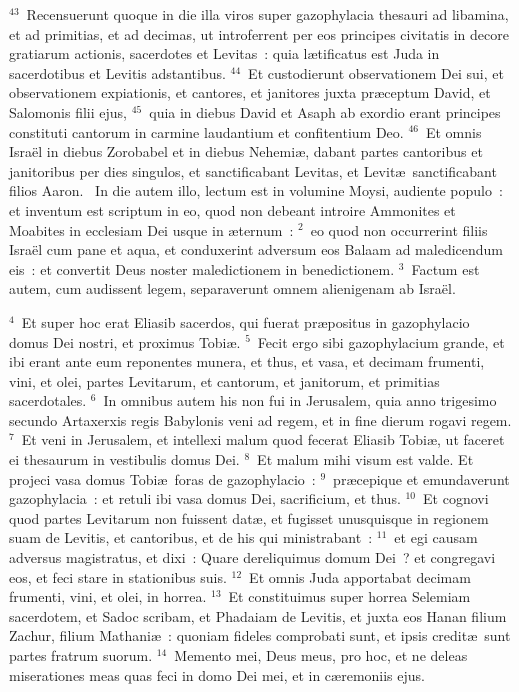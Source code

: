 ${}^{43}$~Recensuerunt quoque in die illa viros super gazophylacia thesauri ad libamina, et ad primitias, et ad decimas, ut introferrent per eos principes civitatis in decore gratiarum actionis, sacerdotes et Levitas~: quia l\ae tificatus est Juda in sacerdotibus et Levitis adstantibus.
${}^{44}$~Et custodierunt observationem Dei sui, et observationem expiationis, et cantores, et janitores juxta pr\ae ceptum David, et Salomonis filii ejus,
${}^{45}$~quia in diebus David et Asaph ab exordio erant principes constituti cantorum in carmine laudantium et confitentium Deo.
${}^{46}$~Et omnis Isra\"el in diebus Zorobabel et in diebus Nehemi\ae , dabant partes cantoribus et janitoribus per dies singulos, et sanctificabant Levitas, et Levit\ae\ sanctificabant filios Aaron.
~In die autem illo, lectum est in volumine Moysi, audiente populo~: et inventum est scriptum in eo, quod non debeant introire Ammonites et Moabites in ecclesiam Dei usque in \ae ternum~:
${}^{2}$~eo quod non occurrerint filiis Isra\"el cum pane et aqua, et conduxerint adversum eos Balaam ad maledicendum eis~: et convertit Deus noster maledictionem in benedictionem.
${}^{3}$~Factum est autem, cum audissent legem, separaverunt omnem alienigenam ab Isra\"el.


${}^{4}$~Et super hoc erat Eliasib sacerdos, qui fuerat pr\ae positus in gazophylacio domus Dei nostri, et proximus Tobi\ae .
${}^{5}$~Fecit ergo sibi gazophylacium grande, et ibi erant ante eum reponentes munera, et thus, et vasa, et decimam frumenti, vini, et olei, partes Levitarum, et cantorum, et janitorum, et primitias sacerdotales.
${}^{6}$~In omnibus autem his non fui in Jerusalem, quia anno trigesimo secundo Artaxerxis regis Babylonis veni ad regem, et in fine dierum rogavi regem.
${}^{7}$~Et veni in Jerusalem, et intellexi malum quod fecerat Eliasib Tobi\ae , ut faceret ei thesaurum in vestibulis domus Dei.
${}^{8}$~Et malum mihi visum est valde. Et projeci vasa domus Tobi\ae\ foras de gazophylacio~:
${}^{9}$~pr\ae cepique et emundaverunt gazophylacia~: et retuli ibi vasa domus Dei, sacrificium, et thus.
${}^{10}$~Et cognovi quod partes Levitarum non fuissent dat\ae , et fugisset unusquisque in regionem suam de Levitis, et cantoribus, et de his qui ministrabant~:
${}^{11}$~et egi causam adversus magistratus, et dixi~: Quare dereliquimus domum Dei~? et congregavi eos, et feci stare in stationibus suis.
${}^{12}$~Et omnis Juda apportabat decimam frumenti, vini, et olei, in horrea.
${}^{13}$~Et constituimus super horrea Selemiam sacerdotem, et Sadoc scribam, et Phadaiam de Levitis, et juxta eos Hanan filium Zachur, filium Mathani\ae~: quoniam fideles comprobati sunt, et ipsis credit\ae\ sunt partes fratrum suorum.
${}^{14}$~Memento mei, Deus meus, pro hoc, et ne deleas miserationes meas quas feci in domo Dei mei, et in c\ae remoniis ejus.



